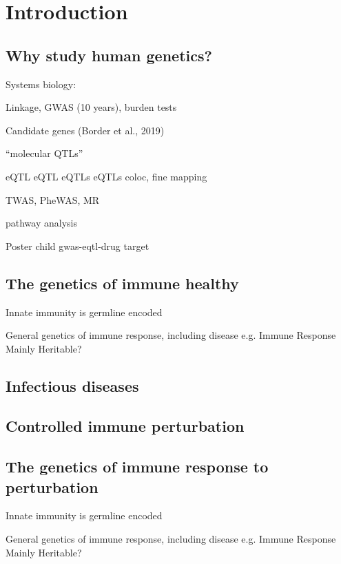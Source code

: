%
%

\chapter{Introduction}

\section{Why study human genetics?}

Systems biology:

Linkage, GWAS (10 years), burden tests

Candidate genes (Border et al., 2019)

\enquote{molecular QTLs}
 

\gls{eQTL}
\gls{eQTL}
\glspl{eQTL}
\Glspl{eQTL}
%
coloc, fine mapping

TWAS, PheWAS\autocite{verma2017CurrentScopeChallenges}, MR

pathway analysis

Poster child gwas-eqtl-drug target

\section{The genetics of immune healthy}

Innate immunity is germline encoded

General genetics of immune response, including disease e.g. Immune Response Mainly Heritable? 

\section{Infectious diseases}

\section{Controlled immune perturbation}

\section{The genetics of immune response to perturbation}

Innate immunity is germline encoded

General genetics of immune response, including disease e.g. Immune Response Mainly Heritable? 


